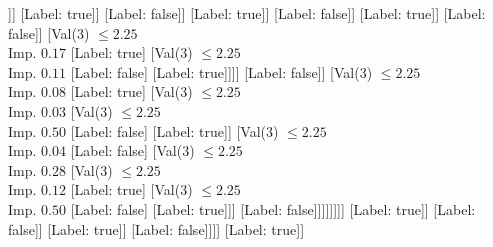 \documentclass[margin=10pt]{standalone}
\begin{document}
\begin{forest}
																										[Val($3$) $ \leq 2.24$ \\ Imp. $0.02$
																											[Val($3$) $ \leq 2.24$ \\ Imp. $0.12$
																												[Val($3$) $ \leq 2.24$ \\ Imp. $0.04$
																													[Val($3$) $ \leq 2.24$ \\ Imp. $0.25$
																														[Val($3$) $ \leq 2.24$ \\ Imp. $0.03$
																															[Label: false]
																															[Val($3$) $ \leq 2.24$ \\ Imp. $0.38$
																																[Label: true]
																																[Label: false]]]
																														[Label: true]]
																													[Label: false]]
																												[Label: true]]
																											[Label: false]]
																										[Label: true]]
																									[Label: false]]
																								[Val($3$) $ \leq 2.25$ \\ Imp. $0.17$
																									[Label: true]
																									[Val($3$) $ \leq 2.25$ \\ Imp. $0.11$
																										[Label: false]
																										[Label: true]]]]
																							[Label: false]]
																						[Val($3$) $ \leq 2.25$ \\ Imp. $0.08$
																							[Label: true]
																							[Val($3$) $ \leq 2.25$ \\ Imp. $0.03$
																								[Val($3$) $ \leq 2.25$ \\ Imp. $0.50$
																									[Label: false]
																									[Label: true]]
																								[Val($3$) $ \leq 2.25$ \\ Imp. $0.04$
																									[Label: false]
																									[Val($3$) $ \leq 2.25$ \\ Imp. $0.28$
																										[Val($3$) $ \leq 2.25$ \\ Imp. $0.12$
																											[Label: true]
																											[Val($3$) $ \leq 2.25$ \\ Imp. $0.50$
																												[Label: false]
																												[Label: true]]]
																										[Label: false]]]]]]]]
																			[Label: true]]
																		[Label: false]]
																	[Label: true]]
																[Label: false]]]]
													[Label: true]]

\end{forest}
\end{document}
